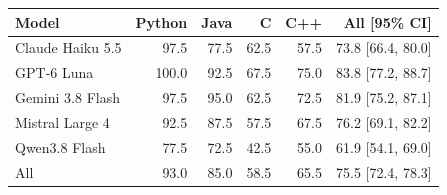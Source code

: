 \begin{tabular}{@{}lrrrrr@{}}
\toprule
Model & Python & Java & C & C++ & All [95\% CI] \\
\midrule
Claude Haiku 5.5 & 97.5 & 77.5 & 62.5 & 57.5 & 73.8 [66.4, 80.0] \\
GPT-6 Luna & 100.0 & 92.5 & 67.5 & 75.0 & 83.8 [77.2, 88.7] \\
Gemini 3.8 Flash & 97.5 & 95.0 & 62.5 & 72.5 & 81.9 [75.2, 87.1] \\
Mistral Large 4 & 92.5 & 87.5 & 57.5 & 67.5 & 76.2 [69.1, 82.2] \\
Qwen3.8 Flash & 77.5 & 72.5 & 42.5 & 55.0 & 61.9 [54.1, 69.0] \\
\midrule
All & 93.0 & 85.0 & 58.5 & 65.5 & 75.5 [72.4, 78.3] \\
\bottomrule
\end{tabular}
